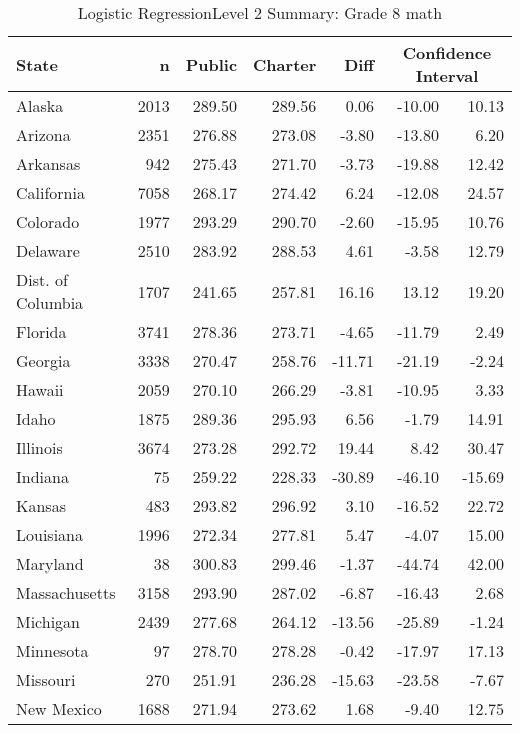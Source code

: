 \begin{table}[ht]
\begin{center}
\caption{Logistic RegressionLevel 2 Summary: Grade 8 math}
\label{g8mathlrlevel2}
\begin{tabular}{lrrrrrr}
  \hline
  State & n & Public & Charter & Diff & \multicolumn{2}{c}{Confidence Interval} \\ \hline
Alaska & 2013 & 289.50 & 289.56 & 0.06 & -10.00 & 10.13 \\ 
  Arizona & 2351 & 276.88 & 273.08 & -3.80 & -13.80 & 6.20 \\ 
  Arkansas & 942 & 275.43 & 271.70 & -3.73 & -19.88 & 12.42 \\ 
  California & 7058 & 268.17 & 274.42 & 6.24 & -12.08 & 24.57 \\ 
  Colorado & 1977 & 293.29 & 290.70 & -2.60 & -15.95 & 10.76 \\ 
  Delaware & 2510 & 283.92 & 288.53 & 4.61 & -3.58 & 12.79 \\ 
  Dist. of Columbia & 1707 & 241.65 & 257.81 & 16.16 & 13.12 & 19.20 \\ 
  Florida & 3741 & 278.36 & 273.71 & -4.65 & -11.79 & 2.49 \\ 
  Georgia & 3338 & 270.47 & 258.76 & -11.71 & -21.19 & -2.24 \\ 
  Hawaii & 2059 & 270.10 & 266.29 & -3.81 & -10.95 & 3.33 \\ 
  Idaho & 1875 & 289.36 & 295.93 & 6.56 & -1.79 & 14.91 \\ 
  Illinois & 3674 & 273.28 & 292.72 & 19.44 & 8.42 & 30.47 \\ 
  Indiana &  75 & 259.22 & 228.33 & -30.89 & -46.10 & -15.69 \\ 
  Kansas & 483 & 293.82 & 296.92 & 3.10 & -16.52 & 22.72 \\ 
  Louisiana & 1996 & 272.34 & 277.81 & 5.47 & -4.07 & 15.00 \\ 
  Maryland &  38 & 300.83 & 299.46 & -1.37 & -44.74 & 42.00 \\ 
  Massachusetts & 3158 & 293.90 & 287.02 & -6.87 & -16.43 & 2.68 \\ 
  Michigan & 2439 & 277.68 & 264.12 & -13.56 & -25.89 & -1.24 \\ 
  Minnesota &  97 & 278.70 & 278.28 & -0.42 & -17.97 & 17.13 \\ 
  Missouri & 270 & 251.91 & 236.28 & -15.63 & -23.58 & -7.67 \\ 
  New Mexico & 1688 & 271.94 & 273.62 & 1.68 & -9.40 & 12.75 \\ 

\end{tabular}
\end{center}
\end{table}
